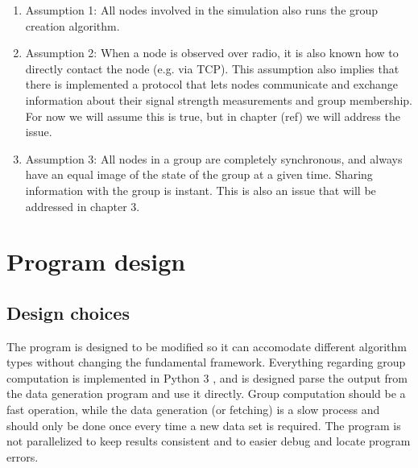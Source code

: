     \begin{enumerate}
    \item Assumption 1: All nodes involved in the simulation also runs the group creation algorithm. 
		\item Assumption 2: When a node is observed over radio, it is also known how to directly contact the node (e.g. via TCP). This assumption also implies that there is implemented a protocol that lets nodes communicate and exchange information about their signal strength measurements and group membership. For now we will assume this is true, but in chapter {{(ref)}} we will address the issue. 
		\item Assumption 3: All nodes in a group are completely synchronous, and always have an equal image of the state of the group at a given time. Sharing information with the group is instant. This is also an issue that will be addressed in chapter {{3}}.
    \end{enumerate}
\section{Program design}
\subsection{Design choices}
The program is designed to be modified so it can accomodate different algorithm types without changing the fundamental framework.
Everything regarding group computation is implemented in Python 3 \cite{Python3}, and is designed parse the output from the data generation program and use it directly.
Group computation should be a fast operation, while the data generation (or fetching) is a slow process and should only be done once every time a new data set is required.
The program is not parallelized to keep results consistent and to easier debug and locate program errors. 

